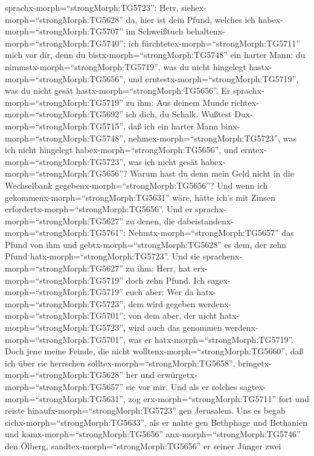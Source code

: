 sprachx-morph=``strongMorph:TG5723'': Herr,
siehex-morph=``strongMorph:TG5628'' da, hier ist dein Pfund, welches ich
habex-morph=``strongMorph:TG5707'' im Schweißtuch
behaltenx-morph=``strongMorph:TG5740'';  ich
fürchtetex-morph=``strongMorph:TG5711'' mich vor dir, denn du
bistx-morph=``strongMorph:TG5748'' ein harter Mann: du
nimmstx-morph=``strongMorph:TG5719'', was du nicht hingelegt
hastx-morph=``strongMorph:TG5656'', und
erntestx-morph=``strongMorph:TG5719'', was du nicht gesät
hastx-morph=``strongMorph:TG5656''.  Er
sprachx-morph=``strongMorph:TG5719'' zu ihm: Aus deinem Munde
richtex-morph=``strongMorph:TG5692'' ich dich, du Schalk. Wußtest
Dux-morph=``strongMorph:TG5715'', daß ich ein harter Mann
binx-morph=``strongMorph:TG5748'', nehmex-morph=``strongMorph:TG5723'',
was ich nicht hingelegt habex-morph=``strongMorph:TG5656'', und
erntex-morph=``strongMorph:TG5723'', was ich nicht gesät
habex-morph=``strongMorph:TG5656''?  Warum hast du denn
mein Geld nicht in die Wechselbank
gegebenx-morph=``strongMorph:TG5656''? Und wenn ich
gekommenx-morph=``strongMorph:TG5631'' wäre, hätte ich's mit Zinsen
erfordertx-morph=``strongMorph:TG5656''.  Und er
sprachx-morph=``strongMorph:TG5627'' zu denen, die
dabeistandenx-morph=``strongMorph:TG5761'':
Nehmtx-morph=``strongMorph:TG5657'' das Pfund von ihm und
gebtx-morph=``strongMorph:TG5628'' es dem, der zehn Pfund
hatx-morph=``strongMorph:TG5723''.  Und sie
sprachenx-morph=``strongMorph:TG5627'' zu ihm: Herr, hat
erx-morph=``strongMorph:TG5719'' doch zehn Pfund.  Ich
sagex-morph=``strongMorph:TG5719'' euch aber: Wer da
hatx-morph=``strongMorph:TG5723'', dem wird gegeben
werdenx-morph=``strongMorph:TG5701''; von dem aber, der nicht
hatx-morph=``strongMorph:TG5723'', wird auch das genommen
werdenx-morph=``strongMorph:TG5701'', was er
hatx-morph=``strongMorph:TG5719''.  Doch jene meine Feinde,
die nicht wolltenx-morph=``strongMorph:TG5660'', daß ich über sie
herrschen solltex-morph=``strongMorph:TG5658'',
bringetx-morph=``strongMorph:TG5628'' her und
erwürgetx-morph=``strongMorph:TG5657'' sie vor mir.  Und
als er solches sagtex-morph=``strongMorph:TG5631'', zog
erx-morph=``strongMorph:TG5711'' fort und reiste
hinaufx-morph=``strongMorph:TG5723'' gen Jerusalem.  Uns es
begab sichx-morph=``strongMorph:TG5633'', als er nahte gen Bethphage und
Bethanien und kamx-morph=``strongMorph:TG5656''
anx-morph=``strongMorph:TG5746'' den Ölberg,
sandtex-morph=``strongMorph:TG5656'' er seiner Jünger zwei 

